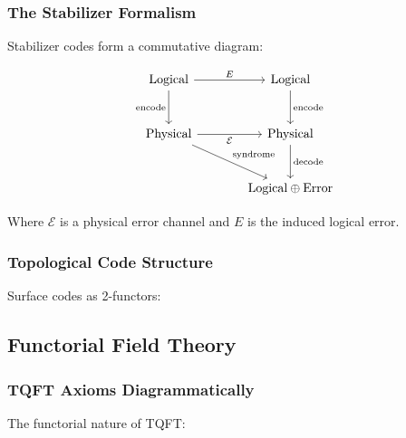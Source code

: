 \subsubsection{The Stabilizer Formalism}

Stabilizer codes form a commutative diagram:

\[
\begin{tikzcd}[row sep=large, column sep=large]
\text{Logical} \arrow[r, "E"] \arrow[d, "\text{encode}"'] & 
\text{Logical} \arrow[d, "\text{encode}"] \\
\text{Physical} \arrow[r, "\mathcal{E}"'] \arrow[dr, "\text{syndrome}"] & 
\text{Physical} \arrow[d, "\text{decode}"] \\
& \text{Logical} \oplus \text{Error}
\end{tikzcd}
\]

Where $\mathcal{E}$ is a physical error channel and $E$ is the induced logical error.

\subsubsection{Topological Code Structure}

Surface codes as 2-functors:

\begin{center}
\end{center}

\subsection{Functorial Field Theory}

\subsubsection{TQFT Axioms Diagrammatically}

The functorial nature of TQFT:

